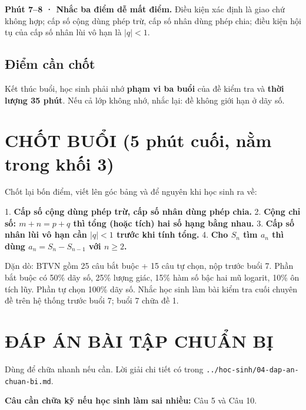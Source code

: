 \documentclass[11pt, a4paper]{article}
\begin{document}
\textbf{Phút 7–8 · Nhắc ba điểm dễ mất điểm.} Điều kiện xác định là giao chứ không hợp; cấp số cộng dùng phép trừ, cấp số nhân dùng phép chia; điều kiện hội tụ của cấp số nhân lùi vô hạn là $\lvert q \rvert < 1$.

\subsection{Điểm cần chốt}

Kết thúc buổi, học sinh phải nhớ \textbf{phạm vi ba buổi} của đề kiểm tra và \textbf{thời lượng 35 phút}. Nếu cả lớp không nhớ, nhắc lại: đề không giới hạn ở dãy số.

\section{CHỐT BUỔI (5 phút cuối, nằm trong khối 3)}

Chốt lại bốn điểm, viết lên góc bảng và để nguyên khi học sinh ra về:

1. \textbf{Cấp số cộng dùng phép trừ, cấp số nhân dùng phép chia.}
2. \textbf{Cộng chỉ số: $m + n = p + q$ thì tổng (hoặc tích) hai số hạng bằng nhau.}
3. \textbf{Cấp số nhân lùi vô hạn cần $\lvert q \rvert < 1$ trước khi tính tổng.}
4. \textbf{Cho $S_n$ tìm $a_n$ thì dùng $a_n = S_n - S_{n-1}$ với $n \ge 2$.}

Dặn dò: BTVN gồm 25 câu bắt buộc + 15 câu tự chọn, nộp trước buổi 7. Phần bắt buộc có 50\% dãy số, 25\% lượng giác, 15\% hàm số bậc hai mũ logarit, 10\% ôn tích lũy. Phần tự chọn 100\% dãy số. Nhắc học sinh làm bài kiểm tra cuối chuyên đề trên hệ thống trước buổi 7; buổi 7 chữa đề 1.

\section{ĐÁP ÁN BÀI TẬP CHUẨN BỊ}

Dùng để chữa nhanh nếu cần. Lời giải chi tiết có trong \texttt{../hoc-sinh/04-dap-an-chuan-bi.md}.


\textbf{Câu cần chữa kỹ nếu học sinh làm sai nhiều:} Câu 5 và Câu 10.
\end{document}
